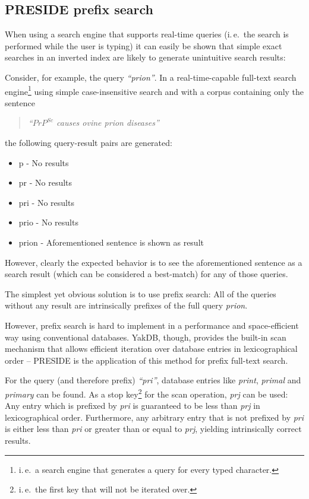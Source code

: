 \documentclass[a4paper, 12pt, twoside, reqn]{report}
\numberwithin{figure}{chapter}
\newtheorem[L]{boxedDefinition}{Definition}
\newtheorem[L]{boxedExample}{Example}
\newcommand{\ie}{i.\,e.\ }
\newcommand{\itquote}[1]{\textit{{``}#1{''}}}
\begin{document}
\afterpage{\clearpage}


\subsection{PRESIDE prefix search}\label{sec:preside}

When using a search engine that supports real-time queries (\ie the search is performed while the user is typing) it can easily be shown that simple exact searches in an inverted index are likely to generate unintuitive search results:

Consider, for example, the query \itquote{prion}. In a real-time-capable full-text search engine\footnote{\ie a search engine that generates a query for every typed character.} using simple case-insensitive search and with a corpus containing only the sentence
\begin{quote}
 \itquote{$PrP^{Sc}$ causes ovine prion diseases}
\end{quote}
the following query-result pairs are generated:

\begin{itemize}
 \item p - No results
 \item pr - No results
 \item pri - No results
 \item prio - No results
 \item prion - Aforementioned sentence is shown as result
\end{itemize}

However, clearly the expected behavior is to see the aforementioned sentence as a search result (which can be considered a best-match) for any of those queries.

The simplest yet obvious solution is to use prefix search: All of the queries without any result are intrinsically prefixes of the full query \textit{prion}.

However, prefix search is hard to implement in a performance and space-efficient way using conventional databases. YakDB, though, provides the built-in scan mechanism that allows efficient iteration over database entries in lexicographical order -- PRESIDE is the application of this method for prefix full-text search.

For the query (and therefore prefix) \itquote{pri}, database entries like \textit{print}, \textit{primal} and \textit{primary} can be found. As a stop key\footnote{\ie the first key that will not be iterated over.} for the scan operation, \textit{prj} can be used: Any entry which is prefixed by \textit{pri} is guaranteed to be less than \textit{prj} in lexicographical order. Furthermore, any arbitrary entry that is not prefixed by \textit{pri} is either less than \textit{pri} or greater than or equal to \textit{prj}, yielding intrinsically correct results.
\end{document}
